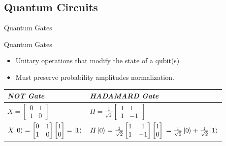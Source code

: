 \documentclass{beamer}
\begin{document}
\subsection{Quantum Circuits}
\begin{frame}{Quantum Gates}
	\begin{block}{Quantum Gates}
		\begin{itemize}
			\item Unitary operations that modify the state of a qubit(s)
			\item Must preserve probability amplitudes normalization.
		\end{itemize}
	\end{block}
	\begin{table}[]
		\begin{tabular}{|l|l|}
			\hline
			\textit{NOT Gate}                                                             & \textit{HADAMARD Gate}                                                                                                                          \\ \hline
			\textit{} $ X = \begin{bmatrix}
					0 & 1 \\
					1 & 0
				\end{bmatrix}  $                                 & $H = \frac{1}{\sqrt{2}} \begin{bmatrix}
					1 & 1  \\
					1 & -1
				\end{bmatrix}$\textit{}                                                                                    \\ \hline
			$X\ket{0} = \begin{bmatrix}
					0 & 1 \\
					1 & 0
				\end{bmatrix} \begin{bmatrix}
					1 \\ 0
				\end{bmatrix} = \ket{1} $ & $H\ket{0}= \frac{1}{\sqrt{2}} \begin{bmatrix}
					1 & 1  \\
					1 & -1
				\end{bmatrix}\begin{bmatrix}
					1 \\ 0
				\end{bmatrix}  $ $= \frac{1}{\sqrt{2}}\ket{0} + \frac{1}{\sqrt{2}}\ket{1}$ \\ \hline
		\end{tabular}
	\end{table}
\end{frame}
\end{document}
